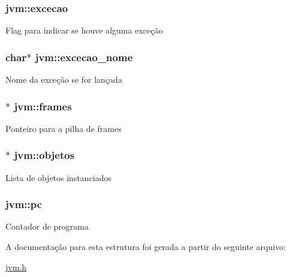 \subsubsection[{\texorpdfstring{excecao}{excecao}}]{ jvm\+::excecao}\hypertarget{structjvm_a9a1827338d5d118644ec0a72a76a5d89}{}\label{structjvm_a9a1827338d5d118644ec0a72a76a5d89}
Flag para indicar se houve alguma exceção 
\subsubsection[{\texorpdfstring{excecao\+\_\+nome}{excecao_nome}}]{\setlength{\rightskip}{0pt plus 5cm}char$\ast$ jvm\+::excecao\+\_\+nome}\hypertarget{structjvm_a471ac752db9424623227c661b194399b}{}\label{structjvm_a471ac752db9424623227c661b194399b}
Nome da exceção se for lançada 
\subsubsection[{\texorpdfstring{frames}{frames}}]{$\ast$ jvm\+::frames}\hypertarget{structjvm_a4277814c8cb94f0e77f09428d3d668b9}{}\label{structjvm_a4277814c8cb94f0e77f09428d3d668b9}
Ponteiro para a pilha de frames 
\subsubsection[{\texorpdfstring{objetos}{objetos}}]{$\ast$ jvm\+::objetos}\hypertarget{structjvm_a4a51ef7b7c771d7f86a22b4d869ac430}{}\label{structjvm_a4a51ef7b7c771d7f86a22b4d869ac430}
Lista de objetos instanciados 
\subsubsection[{\texorpdfstring{pc}{pc}}]{ jvm\+::pc}\hypertarget{structjvm_ac879eb42576afb2256646f478a7f68c2}{}\label{structjvm_ac879eb42576afb2256646f478a7f68c2}
Contador de programa 

A documentação para esta estrutura foi gerada a partir do seguinte arquivo\+:\begin{DoxyCompactItemize}
\item 
\hyperlink{jvm_8h}{jvm.\+h}\end{DoxyCompactItemize}
